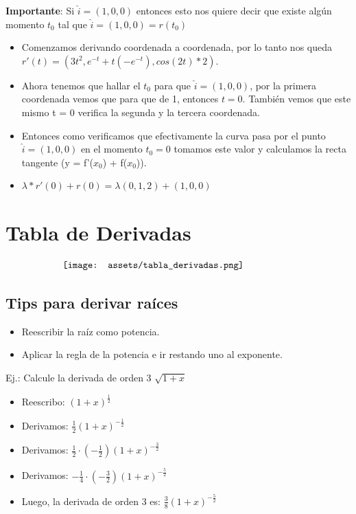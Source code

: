\documentclass[10pt,a4paper]{article}
\begin{document}
\textbf{Importante}: Si $\hat{i} = (1, 0, 0)$ entonces esto nos quiere decir que existe algún momento $t_{0}$ tal que $ \hat{i} = (1, 0, 0) = r(t_{0})$ 
\begin{itemize}
    \item Comenzamos derivando coordenada a coordenada, por lo tanto nos queda $r'(t) = (3t^{2}, e^{-t} + t (-e^{-t}), cos(2t) * 2)$. 
    \item Ahora tenemos que hallar el $t_{0}$ para que $ \hat{i} = (1, 0, 0)$, por la primera coordenada vemos que para que de 1, entonces $t=0$. También vemos que este mismo t = 0 verifica la segunda y la tercera coordenada.
    \item Entonces como verificamos que efectivamente la curva pasa por el punto $ \hat{i} = (1, 0, 0) $ en el momento $t_{0} = 0$ tomamos este valor y calculamos la recta tangente (y = f'($x_{0}$) + f($x_{0}$)). 
    \item $\lambda * r'(0) + r(0) = \lambda(0, 1, 2) + (1, 0, 0)$
\end{itemize}
\section*{Tabla de Derivadas}
\[\begin{minipage}[b]{0.7\textwidth}
    \texttt{[image: assets/tabla\_derivadas.png]}
\end{minipage}\]
\subsection*{Tips para derivar raíces}
\begin{itemize}
    \item Reescribir la raíz como potencia.
    \item Aplicar la regla de la potencia e ir restando uno al exponente.
\end{itemize}
Ej.: Calcule la derivada de orden 3 $\sqrt{1+x}$
\begin{itemize}
    \item Reescribo: $(1+x)^{\frac{1}{2}}$
    \item Derivamos: $\frac{1}{2}(1+x)^{-\frac{1}{2}}$
    \item Derivamos: $\frac{1}{2} \cdot \left(-\frac{1}{2}\right)(1+x)^{-\frac{3}{2}}$
    \item Derivamos: $-\frac{1}{4} \cdot \left(-\frac{3}{2}\right)(1+x)^{-\frac{5}{2}}$
    \item Luego, la derivada de orden 3 es: $\frac{3}{8}(1+x)^{-\frac{5}{2}}$
\end{itemize}
\end{document}
